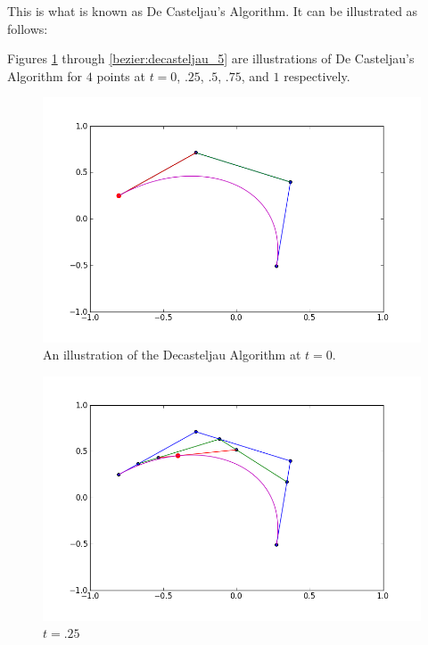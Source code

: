 This is what is known as De Casteljau's Algorithm. 
It can be illustrated as follows:

Figures \ref{bezier:decasteljau_1} through \ref{bezier:decasteljau_5} are illustrations of De Casteljau's Algorithm for $4$ points at $t= 0$, $.25$, $.5$, $.75$, and $1$ respectively.

\begin{figure}
\includegraphics[width=\textwidth]{decasteljau_1}
\caption{An illustration of the Decasteljau Algorithm at $t=0$.}
\label{bezier:decasteljau_1}
\end{figure}

\begin{figure}
\includegraphics[width=\textwidth]{decasteljau_2}
\caption{$t=.25$}
\label{bezier:decasteljau_2}
\end{figure}

